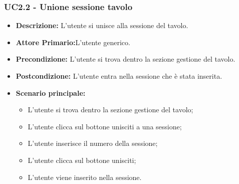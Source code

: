 \subsubsection{UC2.2 - Unione sessione tavolo}
\begin{itemize}
    \item \textbf{Descrizione:} L'utente si unisce alla sessione del tavolo.
    \item \textbf{Attore Primario:}L'utente generico.
    \item \textbf{Precondizione:} L'utente si trova dentro la sezione gestione del tavolo.
    \item \textbf{Postcondizione:} L'utente entra nella sessione che è stata inserita.
    \item \textbf{Scenario principale:}
    \begin{itemize}
        \item L'utente si trova dentro la sezione gestione del tavolo;
        \item L'utente clicca sul bottone unisciti a una sessione;
        \item L'utente inserisce il numero della sessione;
        \item L'utente clicca sul bottone unisciti;
        \item L'utente viene inserito nella sessione.
    \end{itemize}
\end{itemize}
